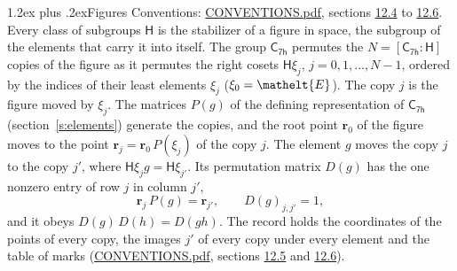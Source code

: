 \documentclass[10pt,a4paper]{article}
\makeatletter
\renewcommand\section{\@startsection{section}{1}{\z@}{-3ex plus -1ex minus -.2ex}%
  {1.2ex plus .2ex}{\normalfont\large\sffamily\bfseries\color{parttitle}}}
\numberwithin{equation}{section}
\newcommand{\eltfont}[1]{{\let\sigma\eltsigma\mathelt{#1}}}
\newcommand{\grp}[1]{\mathsf{#1}}
\newcommand{\cls}[1]{\eltfont{#1}}
\newcommand{\pointr}{\mathbf{r}}
\makeatother
\begin{document}
\section{Figures}\label{s:permutation}
Conventions: \href{../../CONVENTIONS.pdf}{CONVENTIONS.pdf}, sections \href{../../CONVENTIONS.pdf\#conv.12.4}{12.4} to \href{../../CONVENTIONS.pdf\#conv.12.6}{12.6}.
Every class of subgroups $\grp{H}$ is the stabilizer of a figure in space, the subgroup of the elements that carry it into itself. \label{n:local.orbit.size}\label{n:element.coset.least}\label{n:index.coset}The group $\grp{C_{7h}}$ permutes the $N = [\grp{C_{7h}} : \grp{H}]$ copies of the figure as it permutes the right cosets $\grp{H}\xi_j$, $j = 0, 1, \dots, N - 1$, ordered by the indices of their least elements $\xi_j$ ($\xi_0 = \cls{E}$). The copy $j$ is the figure moved by $\xi_j$. The matrices $P(g)$ of the defining representation of $\grp{C_{7h}}$ (section~\ref{s:elements}) generate the copies, and the root point $\pointr_0$ of the figure moves to the point $\pointr_j = \pointr_0\, P(\xi_j)$ of the copy $j$. \label{n:local.coset.image}The element $g$ moves the copy $j$ to the copy $j'$, where $\grp{H}\xi_j g = \grp{H}\xi_{j'}$. \label{n:local.matrix.permutation}Its permutation matrix $D(g)$ has the one nonzero entry of row $j$ in column $j'$,
\begin{equation}\label{e:perm.matrix}\pointr_j\, P(g) = \pointr_{j'}, \qquad D(g)_{j,j'} = 1,\end{equation}
and it obeys $D(g)\, D(h) = D(gh)$. The record holds the coordinates of the points of every copy, the images $j'$ of every copy under every element and the table of marks (\href{../../CONVENTIONS.pdf}{CONVENTIONS.pdf}, sections \href{../../CONVENTIONS.pdf\#conv.12.5}{12.5} and \href{../../CONVENTIONS.pdf\#conv.12.6}{12.6}).
\end{document}
